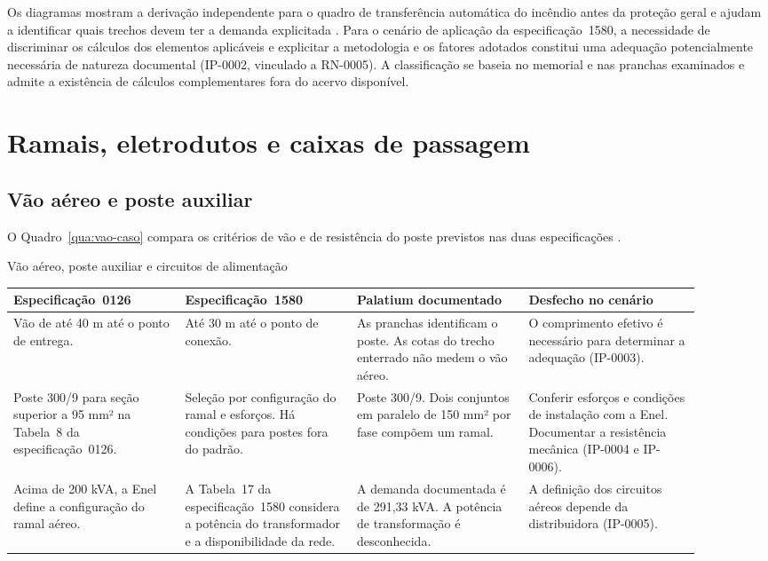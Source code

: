 Os diagramas mostram a derivação independente para o quadro de transferência automática do incêndio antes da proteção geral e ajudam a identificar quais trechos devem ter a demanda explicitada \cite[pranchas~003--005]{palatiumpranchas2025}. Para o cenário de aplicação da especificação~1580, a necessidade de discriminar os cálculos dos elementos aplicáveis e explicitar a metodologia e os fatores adotados constitui uma adequação potencialmente necessária de natureza documental (IP-0002, vinculado a RN-0005). A classificação se baseia no memorial e nas pranchas examinados e admite a existência de cálculos complementares fora do acervo disponível.

\section{Ramais, eletrodutos e caixas de passagem}

\subsection{Vão aéreo e poste auxiliar}\label{subsec:impacto-ramal-poste}

O Quadro~\ref{qua:vao-caso} compara os critérios de vão e de resistência do poste previstos nas duas especificações \cite[itens~7.5.1.4 e~7.6.1.3]{enel0126}\cite[itens~7.16.2--7.16.5]{enel1580}.

\begin{quadro}[!htbp]
\centering
\caption{Vão aéreo, poste auxiliar e circuitos de alimentação}\label{qua:vao-caso}
{\small\setlength{\tabcolsep}{3pt}\renewcommand{\arraystretch}{1.14}
\begin{tabular}{|*{4}{>{\raggedright\arraybackslash}p{0.225\linewidth}|}}\hline
\textbf{Especificação~0126} & \textbf{Especificação~1580} & \textbf{Palatium documentado} & \textbf{Desfecho no cenário} \\\hline
Vão de até 40 m até o ponto de entrega. & Até 30 m até o ponto de conexão. & As pranchas identificam o poste. As cotas do trecho enterrado não medem o vão aéreo. & O comprimento efetivo é necessário para determinar a adequação (IP-0003). \\\hline
Poste 300/9 para seção superior a 95 mm² na Tabela~8 da especificação~0126. & Seleção por configuração do ramal e esforços. Há condições para postes fora do padrão. & Poste 300/9. Dois conjuntos em paralelo de 150 mm² por fase compõem um ramal. & Conferir esforços e condições de instalação com a Enel. Documentar a resistência mecânica (IP-0004 e IP-0006). \\\hline
Acima de 200 kVA, a Enel define a configuração do ramal aéreo. & A Tabela~17 da especificação~1580 considera a potência do transformador e a disponibilidade da rede. & A demanda documentada é de 291,33 kVA. A potência de transformação é desconhecida. & A definição dos circuitos aéreos depende da distribuidora (IP-0005). \\\hline
\end{tabular}}
\end{quadro}

